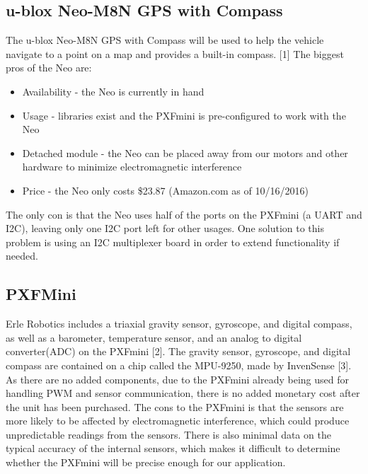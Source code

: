 \documentclass[compsoc,draftclsnofoot,onecolumn,10pt]{IEEEtran}
\begin{document}
\subsection{u-blox Neo-M8N GPS with Compass}
The u-blox Neo-M8N GPS with Compass will be used to help the vehicle navigate to a point on a map and provides a built-in compass. [1] 
The biggest pros of the Neo are:
\begin{itemize}
\item Availability - the Neo is currently in hand
\item Usage - libraries exist and the PXFmini is pre-configured to work with the Neo
\item Detached module - the Neo can be placed away from our motors and other hardware to minimize electromagnetic interference
\item Price - the Neo only costs \$23.87 (Amazon.com as of 10/16/2016)
\end{itemize}
The only con is that the Neo uses half of the ports on the PXFmini (a UART and I2C), leaving only one I2C port left for other usages. One solution to this problem is using an I2C multiplexer board in order to extend functionality if needed. 

\subsection{PXFMini}
Erle Robotics includes a triaxial gravity sensor, gyroscope, and digital compass, as well as a barometer, temperature sensor, and an analog to digital converter(ADC) on the PXFmini [2]. 
The gravity sensor, gyroscope, and digital compass are contained on a chip called the MPU-9250, made by InvenSense [3]. 
As there are no added components, due to the PXFmini already being used for handling PWM and sensor communication, there is no added monetary cost after the unit has been purchased. 
The cons to the PXFmini is that the sensors are more likely to be affected by electromagnetic interference, which could produce unpredictable readings from the sensors. There is also minimal data on the typical accuracy of the internal sensors, which makes it difficult to determine whether the PXFmini will be precise enough for our application. 
\end{document}
